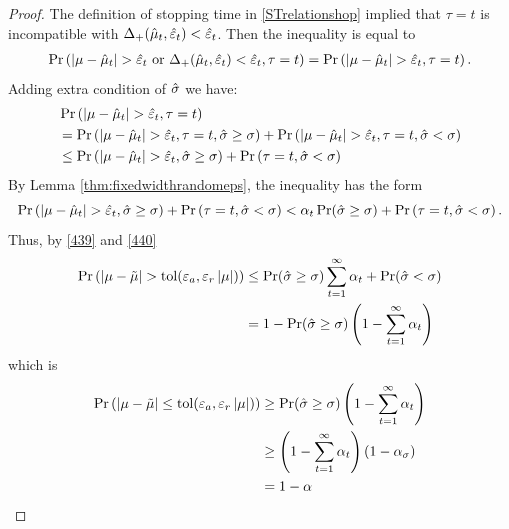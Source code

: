 \documentclass{iitthesis}
\theoremstyle{definition}
\begin{document}
\begin{proof}
The definition of stopping time in \eqref{STrelationshop} implied that $\tau = t$ is incompatible with $ \Delta_{+}(\hat{\mu}_t,\hat{\varepsilon}_t)<\hat{\varepsilon}_t$. Then the inequality is equal to
\begin{align*}
\Pr \left( \left \lvert \mu-\hat{\mu}_t \right \rvert> \hat{\varepsilon}_t  \text{ or } \Delta_{+}(\hat{\mu}_t,\hat{\varepsilon}_t)<\hat{\varepsilon}_t , \tau = t\right)= \Pr \left( \left \lvert \mu-\hat{\mu}_t \right \rvert> \hat{\varepsilon}_t, \tau = t \right).
\end{align*}
Adding extra condition of $\hat{\sigma}$ we have:
\begin{align*}
& \Pr \left( \left \lvert \mu-\hat{\mu}_t \right \rvert> \hat{\varepsilon}_t, \tau = t \right) \\
 &=  \Pr \left( \left \lvert \mu-\hat{\mu}_t \right \rvert> \hat{\varepsilon}_t, \tau = t , \hat{\sigma}\geq\sigma\right) + \Pr \left( \left \lvert \mu-\hat{\mu}_t \right \rvert> \hat{\varepsilon}_t, \tau = t,\hat{\sigma}<\sigma \right) \\
 & \leq \Pr \left( \left \lvert \mu-\hat{\mu}_t \right \rvert> \hat{\varepsilon}_t, \hat{\sigma}\geq\sigma\right) + \Pr \left(  \tau = t,\hat{\sigma}<\sigma \right)
\end{align*}
By Lemma \ref{thm:fixedwidthrandomeps}, the inequality has the form
\begin{equation}\label{440}
\Pr \left( \left \lvert \mu-\hat{\mu}_t \right \rvert> \hat{\varepsilon}_t, \hat{\sigma}\geq\sigma\right) + \Pr \left(  \tau = t,\hat{\sigma}<\sigma \right)\nonumber
<\alpha_t \Pr(\hat{\sigma} \geq \sigma) +\Pr \left(  \tau = t,\hat{\sigma}<\sigma \right).
\end{equation}
Thus, by \eqref{439} and \eqref{440}
\begin{align*}
\Pr \left( \left \lvert \mu-\tilde{\mu} \right \rvert > \operatorname{tol}(\varepsilon_a,\varepsilon_r\left \lvert \mu \right \rvert)\right) 
&\leq \Pr(\hat{\sigma} \geq \sigma) \sum_{t=1}^\infty \alpha_t+\Pr(\hat{\sigma}<\sigma)\\
&=1-\Pr(\hat{\sigma} \geq \sigma)\left(1-\sum_{t=1}^\infty \alpha_t\right)
\end{align*}
which is 
\begin{align*}
\Pr \left( \left \lvert \mu-\tilde{\mu} \right \rvert \leq \operatorname{tol}(\varepsilon_a,\varepsilon_r\left \lvert \mu \right \rvert)\right) &\geq \Pr(\hat{\sigma} \geq \sigma)\left(1-\sum_{t=1}^\infty \alpha_t\right) \\&\geq \left(1-\sum_{t=1}^\infty \alpha_t\right) (1-\alpha_\sigma) \\&= 1-\alpha
\end{align*}
%

\end{proof}
\end{document}
